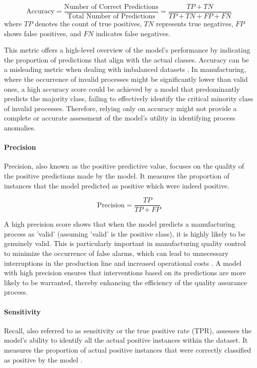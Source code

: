 \begin{equation}
  \text{Accuracy} = \frac{\text{Number of Correct Predictions}}{\text{Total Number of Predictions}} = \frac{TP + TN}{TP + TN + FP + FN}
\end{equation}
where $TP$ denotes the count of true positives, $TN$ represents true negatives, $FP$ shows false positives, and $FN$ indicates false negatives.

This metric offers a high-level overview of the model's performance by indicating the proportion of predictions that align with the actual classes. Accuracy can be a misleading metric when dealing with imbalanced datasets \autocite{fahrmeir2016statistik}. In manufacturing, where the occurrence of invalid processes might be significantly lower than valid ones, a high accuracy score could be achieved by a model that predominantly predicts the majority class, failing to effectively identify the critical minority class of invalid processes. Therefore, relying only on accuracy might not provide a complete or accurate assessment of the model's utility in identifying process anomalies.

\paragraph{\textbf{Precision}}
Precision, also known as the positive predictive value, focuses on the quality of the positive predictions made by the model. It measures the proportion of instances that the model predicted as positive which were indeed positive.


\begin{equation}
  \text{Precision} = \frac{TP}{TP + FP}
\end{equation}

A high precision score shows that when the model predicts a manufacturing process as 'valid' (assuming 'valid' is the positive class), it is highly likely to be genuinely valid. This is particularly important in manufacturing quality control to minimize the occurrence of false alarms, which can lead to unnecessary interruptions in the production line and increased operational costs \autocite{kharitonov2022comparative}. A model with high precision ensures that interventions based on its predictions are more likely to be warranted, thereby enhancing the efficiency of the quality assurance process.

\paragraph{\textbf{Sensitivity}}
Recall, also referred to as sensitivity or the true positive rate (TPR), assesses the model's ability to identify all the actual positive instances within the dataset. It measures the proportion of actual positive instances that were correctly classified as positive by the model \autocite{fahrmeir2016statistik}.

